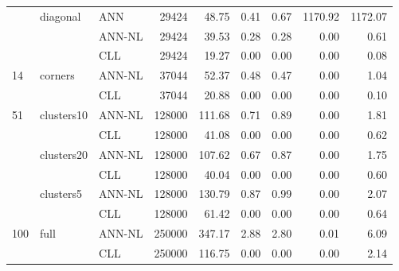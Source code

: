 \begin{tabular}{lllrrrrrr}
    & diagonal & ANN &    29424 &   48.75 &            0.41 &            0.67 &           1170.92 &      1172.07 \\
    &      & ANN-NL &    29424 &   39.53 &            0.28 &            0.28 &              0.00 &         0.61 \\
    &      & CLL &    29424 &   19.27 &            0.00 &            0.00 &              0.00 &         0.08 \\[2.0ex]
14 & corners & ANN-NL &    37044 &   52.37 &            0.48 &            0.47 &              0.00 &         1.04 \\
    &      & CLL &    37044 &   20.88 &            0.00 &            0.00 &              0.00 &         0.10 \\[2.0ex]
51 & clusters10 & ANN-NL &   128000 &  111.68 &            0.71 &            0.89 &              0.00 &         1.81 \\
    &      & CLL &   128000 &   41.08 &            0.00 &            0.00 &              0.00 &         0.62 \\
    & clusters20 & ANN-NL &   128000 &  107.62 &            0.67 &            0.87 &              0.00 &         1.75 \\
    &      & CLL &   128000 &   40.04 &            0.00 &            0.00 &              0.00 &         0.60 \\
    & clusters5 & ANN-NL &   128000 &  130.79 &            0.87 &            0.99 &              0.00 &         2.07 \\
    &      & CLL &   128000 &   61.42 &            0.00 &            0.00 &              0.00 &         0.64 \\[2.0ex]
100 & full & ANN-NL &   250000 &  347.17 &            2.88 &            2.80 &              0.01 &         6.09 \\
    &      & CLL &   250000 &  116.75 &            0.00 &            0.00 &              0.00 &         2.14 \\
\bottomrule
\end{tabular}
